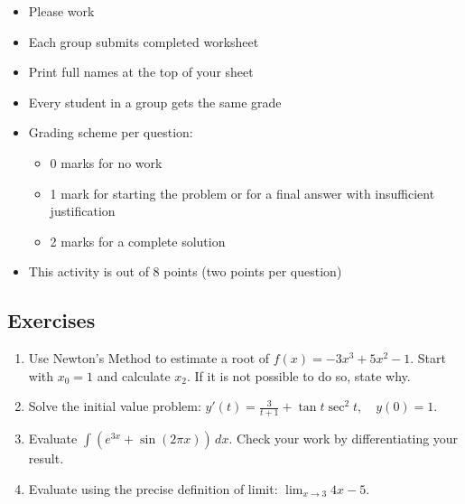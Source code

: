     \begin{itemize}
    \item Please work 
    \item Each group submits  completed worksheet
    \item Print full names at the top of your sheet
    \item Every student in a group gets the same grade
    \item Grading scheme per question:
    	\begin{itemize}
        	\item 0 marks for no work
        	\item 1 mark for starting the problem or for a final answer with insufficient justification
        	\item 2 marks for a complete solution
    	\end{itemize}
    	\item This activity is out of 8 points (two points per question)
    \end{itemize}
    

\subsection*{Exercises}

\begin{enumerate}
	\item Use Newton's Method to estimate a root of $f(x) = -3x^3 +5x^2 -1$. Start with $x_0 = 1$ and calculate $x_2$. If it is not possible to do so, state why. \vspace{3cm}
    
    \item Solve the initial value problem: $\displaystyle y'(t) = \frac{3}{t+1} + \tan t \sec^2 t, \quad y(0) = 1$. \vspace{4cm}
    
    \item Evaluate $\displaystyle \int \left( e^{3x} + \sin(2 \pi x) \right) \,dx$. Check your work by differentiating your result. \vspace{3cm}
    
    \item Evaluate using the precise definition of limit: $\displaystyle \lim_{x\to 3 } 4x -5$.
    
    \vspace{7cm}
    
    
    
    
    
    
    
\end{enumerate}